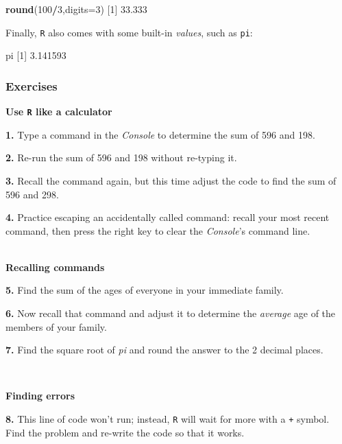 \documentclass[
]{book}
\newenvironment{Shaded}{\begin{snugshade}}{\end{snugshade}}
\newcommand{\DataTypeTok}[1]{\textcolor[rgb]{0.13,0.29,0.53}{#1}}
\newcommand{\DecValTok}[1]{\textcolor[rgb]{0.00,0.00,0.81}{#1}}
\newcommand{\FloatTok}[1]{\textcolor[rgb]{0.00,0.00,0.81}{#1}}
\newcommand{\KeywordTok}[1]{\textcolor[rgb]{0.13,0.29,0.53}{\textbf{#1}}}
\newcommand{\NormalTok}[1]{#1}
\newcommand{\OperatorTok}[1]{\textcolor[rgb]{0.81,0.36,0.00}{\textbf{#1}}}
\begin{document}
\begin{Shaded}
\begin{Highlighting}[]
\KeywordTok{round}\NormalTok{(}\DecValTok{100}\OperatorTok{/}\DecValTok{3}\NormalTok{,}\DataTypeTok{digits=}\DecValTok{3}\NormalTok{)}
\NormalTok{[}\DecValTok{1}\NormalTok{] }\FloatTok{33.333}
\end{Highlighting}
\end{Shaded}

Finally, \texttt{R} also comes with some built-in \emph{values}, such as \texttt{pi}:

\begin{Shaded}
\begin{Highlighting}[]
\NormalTok{pi}
\NormalTok{[}\DecValTok{1}\NormalTok{] }\FloatTok{3.141593}
\end{Highlighting}
\end{Shaded}

\hypertarget{exercises}{%
\subsubsection*{Exercises}\label{exercises}}

\textbf{Use \texttt{R} like a calculator}

\textbf{1.} Type a command in the \emph{Console} to determine the sum of 596 and 198.

\textbf{2.} Re-run the sum of 596 and 198 without re-typing it.

\textbf{3.} Recall the command again, but this time adjust the code to find the sum of 596 and 298.

\textbf{4.} Practice escaping an accidentally called command: recall your most recent command, then press the right key to clear the \emph{Console}'s command line.

~\\
\textbf{Recalling commands}

\textbf{5.} Find the sum of the ages of everyone in your immediate family.

\textbf{6.} Now recall that command and adjust it to determine the \emph{average} age of the members of your family.

\textbf{7.} Find the square root of \emph{pi} and round the answer to the 2 decimal places.

~

\textbf{Finding errors}

\textbf{8.} This line of code won't run; instead, \texttt{R} will wait for more with a \texttt{+} symbol. Find the problem and re-write the code so that it works.
\end{document}
